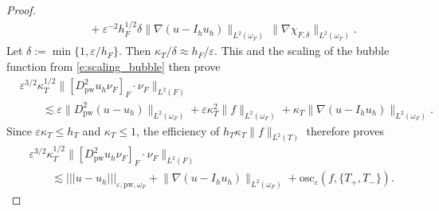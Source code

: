 \documentclass[a4paper]{amsart}
\theoremstyle{definition}
\numberwithin{equation}{section}
\numberwithin{theorem}{section}
\newcommand{\pw}{\mathrm{pw}}
\newcommand{\osc}{\mathrm{osc}}
\newcommand{\ennorm}[1]{\lvert\!\lvert\!\lvert #1 \rvert\!\rvert\!\rvert}
\begin{document}
\begin{proof}
\begin{align*}
        &\qquad
         + \varepsilon^{-2} h_F^{1/2} \delta
           \lVert \nabla(u-I_h u_h)\rVert_{L^2(\omega_F)} 
            \, \lVert \nabla\chi_{F,\delta}\rVert_{L^2(\omega_F)}.
    \end{align*}
    Let $\delta:=\min\{1,\varepsilon/h_F\}$. 
    Then $\kappa_T/\delta \approx h_F/\varepsilon$.
    This and 
    the scaling of the bubble function from \eqref{e:scaling_bubble}
    then prove
    \begin{align*}
        &\varepsilon^{3/2}\kappa_T^{1/2}
        \lVert [D_\pw^2 u_h\nu_F]_F\cdot\nu_F\rVert_{L^2(F)}\\
        &\qquad 
        \lesssim \varepsilon \lVert D_\pw^2(u-u_h)\rVert_{L^2(\omega_F)}
         + \varepsilon\kappa_T^2
           \lVert f\rVert_{L^2(\omega_F)} 
         + \kappa_T 
           \lVert \nabla(u-I_h u_h)\rVert_{L^2(\omega_F)}.
    \end{align*}
    Since $\varepsilon\kappa_T \leq h_T$ and $\kappa_T\leq 1$, the efficiency 
    of $h_T\kappa_T\lVert f\rVert_{L^2(T)}$ 
    therefore proves 
    \begin{align*}
        &\varepsilon^{3/2}\kappa_T^{1/2}
        \lVert [D_\pw^2 u_h\nu_F]_F\cdot\nu_F\rVert_{L^2(F)}\\
        &\qquad 
        \lesssim \ennorm{u-u_h}_{\varepsilon,\pw,\omega_F}
         + \lVert \nabla(u-I_h u_h)\rVert_{L^2(\omega_F)}
         + \osc_\varepsilon(f,\{T_+,T_-\}).
    \end{align*}
    

\end{proof}
\end{document}
